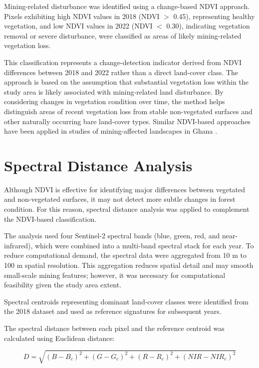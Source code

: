 \documentclass[a4paper,12pt]{report}
\begin{document}
Mining-related disturbance was identified using a change-based NDVI approach. Pixels exhibiting high NDVI values in 2018 (NDVI $>$ 0.45), representing healthy vegetation, and low NDVI values in 2022 (NDVI $<$ 0.30), indicating vegetation removal or severe disturbance, were classified as areas of likely mining-related vegetation loss.

This classification represents a change-detection indicator derived from NDVI differences between 2018 and 2022 rather than a direct land-cover class. The approach is based on the assumption that substantial vegetation loss within the study area is likely associated with mining-related land disturbance. By considering changes in vegetation condition over time, the method helps distinguish areas of recent vegetation loss from stable non-vegetated surfaces and other naturally occurring bare land-cover types. Similar NDVI-based approaches have been applied in studies of mining-affected landscapes in Ghana \citep{barenblitt2021ghana}.


\section{Spectral Distance Analysis}

Although NDVI is effective for identifying major differences between vegetated and non-vegetated surfaces, it may not detect more subtle changes in forest condition. For this reason, spectral distance analysis was applied to complement the NDVI-based classification.

The analysis used four Sentinel-2 spectral bands (blue, green, red, and near-infrared), which were combined into a multi-band spectral stack for each year. To reduce computational demand, the spectral data were aggregated from 10 m to 100 m spatial resolution. This aggregation reduces spatial detail and may smooth small-scale mining features; however, it was necessary for computational feasibility given the study area extent.

Spectral centroids representing dominant land-cover classes were identified from the 2018 dataset and used as reference signatures for subsequent years.

The spectral distance between each pixel and the reference centroid was calculated using Euclidean distance:

\begin{equation}
D = \sqrt{(B - B_c)^2 + (G - G_c)^2 + (R - R_c)^2 + (NIR - NIR_c)^2}
\end{equation}
\end{document}

